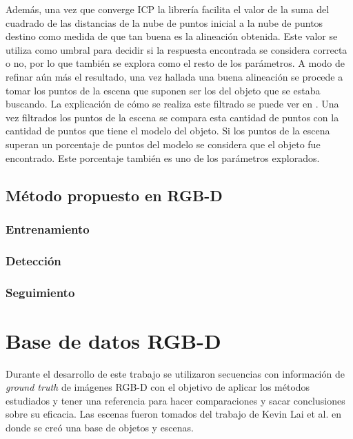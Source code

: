 Además, una vez que converge ICP la librería facilita el valor de la suma del cuadrado de las distancias de la nube de puntos inicial a la nube de puntos destino como medida de que tan buena es la alineación obtenida. Este valor se utiliza como umbral para decidir si la respuesta encontrada se considera correcta o no, por lo que también se explora como el resto de los parámetros. A modo de refinar aún más el resultado, una vez hallada una buena alineación se procede a tomar los puntos de la escena que suponen ser los del objeto que se estaba buscando. La explicación de cómo se realiza este filtrado se puede ver en . Una vez filtrados los puntos de la escena se compara esta cantidad de puntos con la cantidad de puntos que tiene el modelo del objeto. Si los puntos de la escena superan un porcentaje de puntos del modelo se considera que el objeto fue encontrado. Este porcentaje también es uno de los parámetros explorados.


\section{Método propuesto en RGB-D}\label{metodo_rgbd}

\subsection{Entrenamiento}

\subsection{Detección}

\subsection{Seguimiento}\label{tracking_rgbd}






\chapter{Base de datos RGB-D}\label{base_rgbd}
Durante el desarrollo de este trabajo se utilizaron secuencias con información de \textit{ground truth} de imágenes RGB-D con el objetivo de aplicar los métodos estudiados y tener una referencia para hacer comparaciones y sacar conclusiones sobre su eficacia. Las escenas fueron tomados del trabajo de Kevin Lai et al. \cite{lai2011large} en donde se creó una base de objetos y escenas.

